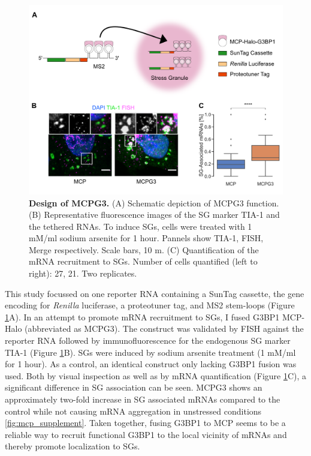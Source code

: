 \begin{figure}[b!]
    \centering
    \includegraphics[width=\linewidth]{images/figure2}
    \caption{\textbf{Design of MCPG3.}
        (A) Schematic depiction of MCPG3 function.
        (B) Representative fluorescence images of the SG marker
            TIA-1 and the tethered RNAs.
            To induce SGs, cells were treated with 1 mM/ml sodium arsenite for 1 hour.
            Pannels show TIA-1, FISH, Merge respectively.
            Scale bars, 10 \textmu m.
        (C) Quantification of the mRNA recruitment to SGs.
            Number of cells quantified (left to right): 27, 21. Two replicates.
    }
    \label{fig:mcp_images}
\end{figure}

This study focussed on one reporter RNA containing a SunTag cassette, the gene encoding for \textit{Renilla} luciferase, a proteotuner tag, and MS2 stem-loops (Figure \ref{fig:mcp_images}A).
In an attempt to promote mRNA recruitment to SGs, I fused G3BP1 MCP-Halo (abbreviated as MCPG3).
The construct was validated by FISH against the reporter RNA followed by immunofluorescence for the endogenous SG marker TIA-1 \cite{kedersha_rna-binding_1999} (Figure \ref{fig:mcp_images}B).
SGs were induced by sodium arsenite treatment (1 mM/ml for 1 hour).
As a control, an identical construct only lacking G3BP1 fusion was used.
Both by visual inspection as well as by mRNA quantification (Figure \ref{fig:mcp_images}C), a significant difference in SG association can be seen.
MCPG3 shows an approximately two-fold increase in SG associated mRNAs compared to the control while not causing mRNA aggregation in unstressed conditions \ref{fig:mcp_supplement}.
Taken together, fusing G3BP1 to MCP seems to be a reliable way to recruit functional G3BP1 to the local vicinity of mRNAs and thereby promote localization to SGs.


